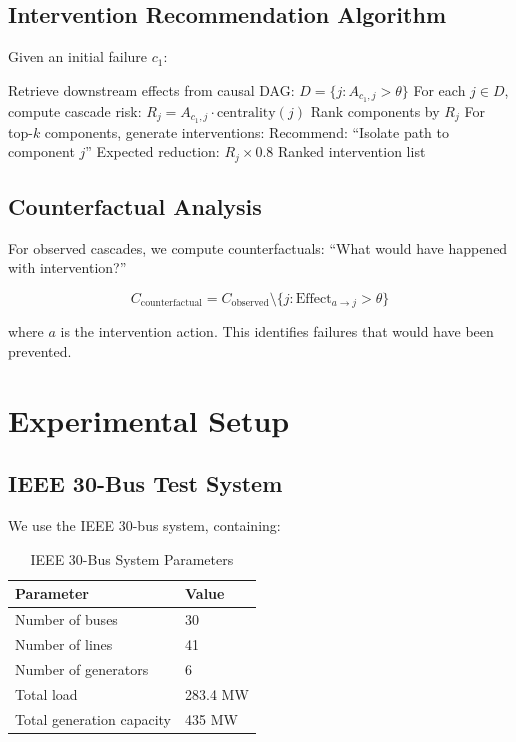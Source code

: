 \documentclass[journal,12pt,onecolumn]{IEEEtran}
\begin{document}
\subsection{Intervention Recommendation Algorithm}

Given an initial failure $c_1$:

\begin{algorithm}
\caption{Intervention Recommendation}
\begin{algorithmic}[1]
\STATE Retrieve downstream effects from causal DAG: $D = \{j : A_{c_1, j} > \theta\}$
\STATE For each $j \in D$, compute cascade risk: $R_j = A_{c_1, j} \cdot \text{centrality}(j)$
\STATE Rank components by $R_j$
\STATE For top-$k$ components, generate interventions:
    \STATE Recommend: ``Isolate path to component $j$''
    \STATE Expected reduction: $R_j \times 0.8$
\ENDFOR
\RETURN Ranked intervention list
\end{algorithmic}
\end{algorithm}

\subsection{Counterfactual Analysis}

For observed cascades, we compute counterfactuals: ``What would have happened with intervention?''

\begin{equation}
C_{\text{counterfactual}} = C_{\text{observed}} \setminus \{j : \text{Effect}_{a \rightarrow j} > \theta\}
\label{eq:counterfactual}
\end{equation}

where $a$ is the intervention action. This identifies failures that would have been prevented.

\section{Experimental Setup}
\label{sec:experimental}

\subsection{IEEE 30-Bus Test System}

We use the IEEE 30-bus system, containing:

\begin{table}[htbp]
\caption{IEEE 30-Bus System Parameters}
\label{tab:system}
\centering
\begin{tabular}{ll}
\toprule
\textbf{Parameter} & \textbf{Value} \\
\midrule
Number of buses & 30 \\
Number of lines & 41 \\
Number of generators & 6 \\
Total load & 283.4 MW \\
Total generation capacity & 435 MW \\
\bottomrule
\end{tabular}
\end{table}
\end{document}
